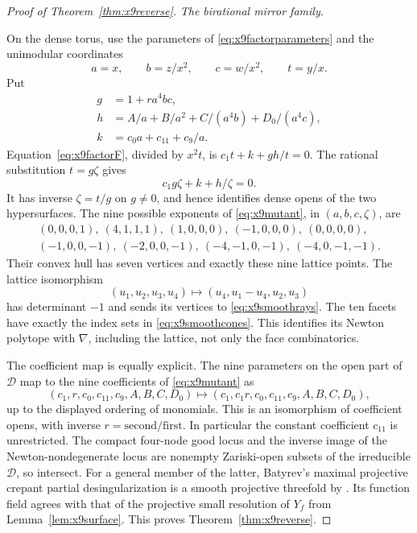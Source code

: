 \begin{proof}[Proof of Theorem~\ref{thm:x9reverse}]
\emph{The birational mirror family.}

On the dense torus, use the parameters of
\eqref{eq:x9factorparameters} and the unimodular coordinates
\[
 a=x,\qquad b=z/x^2,\qquad c=w/x^2,\qquad t=y/x.
\]
Put
\begin{equation}\label{eq:x9mutationfactors}
\begin{split}
 g&=1+ra^4bc,\\
 h&=A/a+B/a^2+C/(a^4b)+D_0/(a^4c),\\
 k&=c_0a+c_{11}+c_9/a.
\end{split}
\end{equation}
Equation~\eqref{eq:x9factorF}, divided by $x^2t$, is
$c_1t+k+gh/t=0$. The rational substitution $t=g\zeta$ gives
\begin{equation}\label{eq:x9mutant}
 c_1g\zeta+k+h/\zeta=0.
\end{equation}
It has inverse $\zeta=t/g$ on $g\ne0$, and hence identifies dense
opens of the two hypersurfaces. The nine possible exponents of
\eqref{eq:x9mutant}, in $(a,b,c,\zeta)$, are
\begin{equation}\label{eq:x9mutantsupport}
\begin{gathered}
 (0,0,0,1),\ (4,1,1,1),\ (1,0,0,0),\ (-1,0,0,0),\ (0,0,0,0),\\
 (-1,0,0,-1),\ (-2,0,0,-1),\ (-4,-1,0,-1),\ (-4,0,-1,-1).
\end{gathered}
\end{equation}
Their convex hull has seven vertices and exactly these nine lattice
points. The lattice isomorphism
\[
 (u_1,u_2,u_3,u_4)\longmapsto(u_4,u_1-u_4,u_2,u_3)
\]
has determinant $-1$ and sends its vertices to
\eqref{eq:x9smoothrays}. The ten facets have exactly the index sets
in \eqref{eq:x9smoothcones}. This identifies its Newton polytope with
$\nabla$, including the lattice, not only the face combinatorics.

The coefficient map is equally explicit. The nine parameters on the
open part of $\mathcal D$ map to the nine coefficients of
\eqref{eq:x9mutant} as
\begin{equation}\label{eq:x9coefficientmap}
 (c_1,r,c_0,c_{11},c_9,A,B,C,D_0)\longmapsto
 (c_1,c_1r,c_0,c_{11},c_9,A,B,C,D_0),
\end{equation}
up to the displayed ordering of monomials. This is an isomorphism of
coefficient opens, with inverse $r=\text{second}/\text{first}$.
In particular the constant coefficient $c_{11}$ is unrestricted.
The compact four-node good locus and the inverse image of the
Newton-nondegenerate locus are nonempty Zariski-open subsets of the
irreducible $\mathcal D$, so intersect. For a general member of the latter, Batyrev's maximal projective
crepant partial desingularization is a smooth projective threefold
by \cite[Thm.~4.2.2, Cor.~4.2.3]{Batyrev}.
Its function field agrees with that of the projective small resolution
of $Y_f$ from Lemma~\ref{lem:x9surface}. This proves
Theorem~\ref{thm:x9reverse}.
\end{proof}

